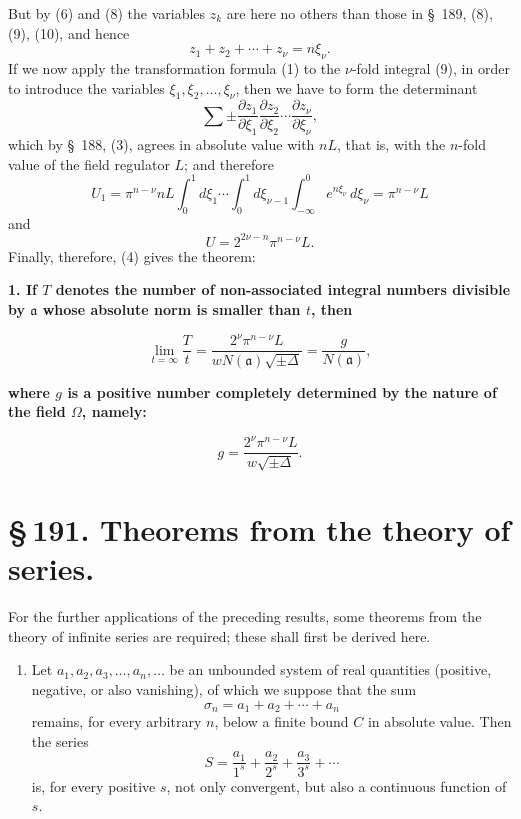 \documentclass[11pt]{article}
\begin{document}
But by (6) and (8) the variables $z_k$ are here no others than those in \S~189, (8), (9), (10), and hence
\[
z_1+z_2+\cdots+z_\nu=n\xi_\nu.
\]
If we now apply the transformation formula (1) to the $\nu$-fold integral (9), in order to introduce the variables $\xi_1,\xi_2,\ldots,\xi_\nu$, then we have to form the determinant
\[
\sum\pm
\frac{\partial z_1}{\partial\xi_1}
\frac{\partial z_2}{\partial\xi_2}\cdots
\frac{\partial z_\nu}{\partial\xi_\nu},
\]
which by \S~188, (3), agrees in absolute value with $nL$, that is, with the $n$-fold value of the field regulator $L$; and therefore
\[
U_1=\pi^{n-\nu}nL\int_0^1d\xi_1\cdots\int_0^1d\xi_{\nu-1}\int_{-\infty}^{0}e^{n\xi_\nu}\,d\xi_\nu
=\pi^{n-\nu}L
\]
and
\[
U=2^{2\nu-n}\pi^{n-\nu}L.
\]
Finally, therefore, (4) gives the theorem:

\begin{center}
\textbf{1. If $T$ denotes the number of non-associated integral numbers divisible by $\mathfrak a$ whose absolute norm is smaller than $t$, then}
\end{center}
\begin{equation}
\lim_{t=\infty}\frac{T}{t}
=
\frac{2^\nu\pi^{n-\nu}L}{wN(\mathfrak a)\sqrt{\pm\Delta}}
=
\frac{g}{N(\mathfrak a)},
\tag{10}
\end{equation}
\begin{center}
\textbf{where $g$ is a positive number completely determined by the nature of the field $\Omega$, namely:}
\end{center}
\begin{equation}
g=\frac{2^\nu\pi^{n-\nu}L}{w\sqrt{\pm\Delta}}.
\tag{11}
\end{equation}

\clearpage
\section*{\S\,191. Theorems from the theory of series.}

For the further applications of the preceding results, some theorems from the theory of infinite series are required; these shall first be derived here.

\begin{enumerate}[label=\textbf{\arabic*.},leftmargin=2.2em]
\item Let $a_1,a_2,a_3,\ldots,a_n,\ldots$ be an unbounded system of real quantities (positive, negative, or also vanishing), of which we suppose that the sum
\begin{equation}
\sigma_n=a_1+a_2+\cdots+a_n
\tag{1}
\end{equation}
remains, for every arbitrary $n$, below a finite bound $C$ in absolute value. Then the series
\begin{equation}
S=\frac{a_1}{1^s}+\frac{a_2}{2^s}+\frac{a_3}{3^s}+\cdots
\tag{2}
\end{equation}
is, for every positive $s$, not only convergent, but also a continuous function of $s$.
\end{enumerate}
\end{document}
